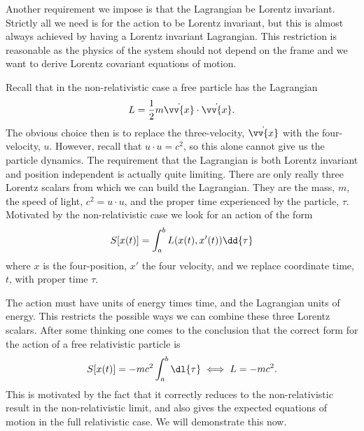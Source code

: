 Another requirement we impose is that the Lagrangian be Lorentz invariant.
Strictly all we need is for the action to be Lorentz invariant, but this is almost always achieved by having a Lorentz invariant Lagrangian.
This restriction is reasonable as the physics of the system should not depend on the frame and we want to derive Lorentz covariant equations of motion.

Recall that in the non-relativistic case a free particle has the Lagrangian
\begin{equation}
    \lagrangian = \frac{1}{2}m\dot{\vv{x}}\cdot\dot{\vv{x}}.
\end{equation}
The obvious choice then is to replace the three-velocity, \(\dot{\vv{x}}\) with the four-velocity, \(u\).
However, recall that \(u \cdot u = c^2\), so this alone cannot give us the particle dynamics.
The requirement that the Lagrangian is both Lorentz invariant and position independent is actually quite limiting.
There are only really three Lorentz scalars from which we can build the Lagrangian.
They are the mass, \(m\), the speed of light, \(c^2 = u \cdot u\), and the proper time experienced by the particle, \(\tau\).
Motivated by the non-relativistic case we look for an action of the form
\begin{equation}
    S[x(t)] = \int_a^b \lagrangian(x(t), x'(t)) \dd{\tau}
\end{equation}
where \(x\) is the four-position, \(x'\) the four velocity, and we replace coordinate time, \(t\), with proper time \(\tau\).

The action must have units of energy times time, and the Lagrangian units of energy.
This restricts the possible ways we can combine these three Lorentz scalars.
After some thinking one comes to the conclusion that the correct form for the action of a free relativistic particle is
\begin{equation}
    S[x(t)] = -mc^2 \int_a^b \dl{\tau} \iff \lagrangian = -mc^2.
\end{equation}
This is motivated by the fact that it correctly reduces to the non-relativistic result in the non-relativistic limit, and also gives the expected equations of motion in the full relativistic case.
We will demonstrate this now.


